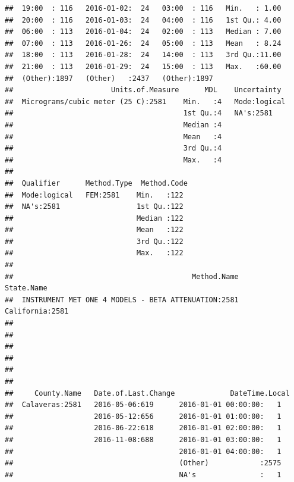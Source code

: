 \documentclass[]{book}
\begin{document}
\begin{verbatim}
##  19:00  : 116   2016-01-02:  24   03:00  : 116   Min.   : 1.00     
##  20:00  : 116   2016-01-03:  24   04:00  : 116   1st Qu.: 4.00     
##  06:00  : 113   2016-01-04:  24   02:00  : 113   Median : 7.00     
##  07:00  : 113   2016-01-26:  24   05:00  : 113   Mean   : 8.24     
##  18:00  : 113   2016-01-28:  24   14:00  : 113   3rd Qu.:11.00     
##  21:00  : 113   2016-01-29:  24   15:00  : 113   Max.   :60.00     
##  (Other):1897   (Other)   :2437   (Other):1897                     
##                       Units.of.Measure      MDL    Uncertainty   
##  Micrograms/cubic meter (25 C):2581    Min.   :4   Mode:logical  
##                                        1st Qu.:4   NA's:2581     
##                                        Median :4                 
##                                        Mean   :4                 
##                                        3rd Qu.:4                 
##                                        Max.   :4                 
##                                                                  
##  Qualifier      Method.Type  Method.Code 
##  Mode:logical   FEM:2581    Min.   :122  
##  NA's:2581                  1st Qu.:122  
##                             Median :122  
##                             Mean   :122  
##                             3rd Qu.:122  
##                             Max.   :122  
##                                          
##                                          Method.Name        State.Name  
##  INSTRUMENT MET ONE 4 MODELS - BETA ATTENUATION:2581   California:2581  
##                                                                         
##                                                                         
##                                                                         
##                                                                         
##                                                                         
##                                                                         
##     County.Name   Date.of.Last.Change             DateTime.Local
##  Calaveras:2581   2016-05-06:619      2016-01-01 00:00:00:   1  
##                   2016-05-12:656      2016-01-01 01:00:00:   1  
##                   2016-06-22:618      2016-01-01 02:00:00:   1  
##                   2016-11-08:688      2016-01-01 03:00:00:   1  
##                                       2016-01-01 04:00:00:   1  
##                                       (Other)            :2575  
##                                       NA's               :   1
\end{verbatim}
\end{document}
